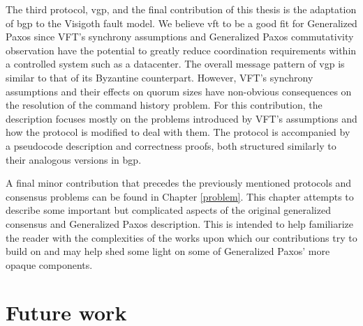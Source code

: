 The third protocol, \acrlong{vgp}, and the final contribution of this thesis is the adaptation of \acrshort{bgp} to the Visigoth fault model. We believe \acrshort{vft} to be a good fit for Generalized Paxos since VFT's synchrony assumptions and Generalized Paxos commutativity observation have the potential to greatly reduce coordination requirements within a controlled system such as a datacenter. The overall message pattern of \acrshort{vgp} is similar to that of its Byzantine counterpart. However, VFT's synchrony assumptions and their effects on quorum sizes have non-obvious consequences on the resolution of the command history problem. For this contribution, the description focuses mostly on the problems introduced by VFT's assumptions and how the protocol is modified to deal with them. The protocol is accompanied by a pseudocode description and correctness proofs, both structured similarly to their analogous versions in \acrshort{bgp}. \par
A final minor contribution that precedes the previously mentioned protocols and consensus problems can be found in Chapter \ref{problem}. This chapter attempts to describe some important but complicated aspects of the original generalized consensus and Generalized Paxos description. This is intended to help familiarize the reader with the complexities of the works upon which our contributions try to build on and may help shed some light on some of Generalized Paxos' more opaque components.

\section{Future work}

